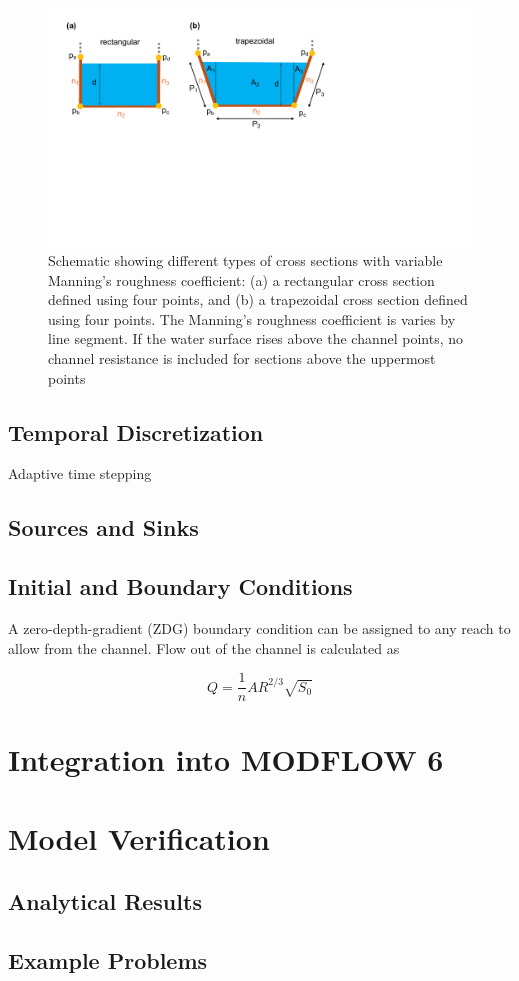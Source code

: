\documentclass[fleqn]{article}
\begin{document}
\begin{figure}
	\centering
	\includegraphics[scale=0.5]{figures/cxs_rough.pdf}
	\caption[Schematic showing different types of channel cross sections with variable roughness.]{Schematic showing different types of cross sections with variable Manning's roughness coefficient: (a) a rectangular cross section defined using four points, and (b) a trapezoidal cross section defined using four points.  The Manning's roughness coefficient is varies by line segment.  If the water surface rises above the channel points, no channel resistance is included for sections above the uppermost points}
	\label{fig:cxs_rough}
\end{figure}


\subsection{Temporal Discretization}
Adaptive time stepping

\subsection{Sources and Sinks}

\subsection{Initial and Boundary Conditions}

A zero-depth-gradient (ZDG) boundary condition can be assigned to any reach to allow from the channel.  Flow out of the channel is calculated as

\begin{equation}
  Q = \frac{1}{n}A R^{2/3} \sqrt{S_0}
\end{equation}


\section{Integration into MODFLOW 6}

\section{Model Verification}

\subsection{Analytical Results}

\subsection{Example Problems}
\end{document}
